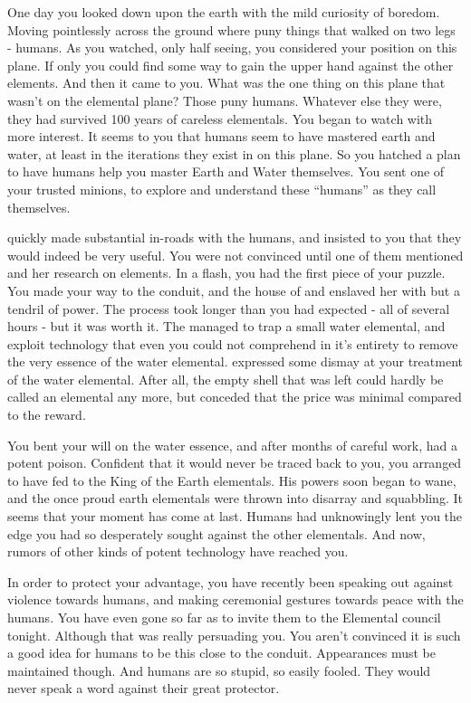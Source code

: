 \documentclass[char]{guildcamp1}
\begin{document}
One day you looked down upon the earth with the mild curiosity of boredom. Moving pointlessly across the ground where puny things that walked on two legs - humans. As you watched, only half seeing, you considered your position on this plane. If only you could find some way to gain the upper hand against the other elements. And then it came to you. What was the one thing on this plane that wasn't on the elemental plane? Those puny humans. Whatever else they were, they had survived 100 years of careless elementals. You began to watch with more interest. It seems to you that humans seem to have mastered earth and water, at least in the iterations they exist in on this plane.  So you hatched a plan to have humans help you master Earth and Water themselves. You sent one of your trusted minions, \cNaturalist{\MYname{}} to explore and understand these ``humans'' as they call themselves.

\cNaturalist{\MYname{}} quickly made substantial in-roads with the humans, and insisted to you that they would indeed be very useful. You were not convinced until one of them mentioned \cGranddaughter{\MYname{}} and her research on elements. In a flash, you had the first piece of your puzzle. You made your way to the conduit, and the house of \cGranddaughter{\MYname{}} and enslaved her with but a tendril of power. The process took longer than you had expected - all of several hours - but it was worth it. The \cGranddaughter{\kid} managed to trap a small water elemental, and exploit technology that even you could not comprehend in it's entirety to remove the very essence of the water elemental. \cNaturalist{\MYname{}} expressed some dismay at your treatment of the water elemental. After all, the empty shell that was left could hardly be called an elemental any more, but \cNaturalist{\they} conceded that the price was minimal compared to the reward.

You bent your will on the water essence, and after months of careful work, had a potent poison. Confident that it would never be traced back to you, you arranged to have fed to the King of the Earth elementals. His powers soon began to wane, and the once proud earth elementals were thrown into disarray and squabbling. It seems that your moment has come at last. Humans had unknowingly lent you the edge you had so desperately sought against the other elementals. And now, rumors of other kinds of potent technology have reached you.

In order to protect your advantage, you have recently been speaking out against violence towards humans, and making ceremonial gestures towards peace with the humans. You have even gone so far as to invite them to the Elemental council tonight. Although that was really \cNaturalist{\MYname{}} persuading you. You aren't convinced it is such a good idea for humans to be this close to the conduit. Appearances must be maintained though. And humans are so stupid, so easily fooled. They would never speak a word against their great protector.
\end{document}
